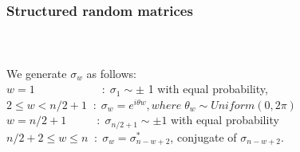\begin{frame}[t]
	\frametitle{Structured random matrices}
	\framesubtitle{~~}  %
	We generate $\sigma_{w}$ as follows:
    \\[1em]
    
    $w=1\qquad \qquad \qquad : \; \sigma_{1} \sim \pm$ 1 with equal probability,
    \\[1em]
    $2 \le w < n/2+1 \; \; : \; \sigma_{w}=e^{i\theta w}, where \; {\theta}_{w} \sim Uniform(0,2\pi) $
    \\[1em]
    $w=n/2+1 \qquad \; \; \, : \; \sigma_{n/2+1} \sim \pm 1 $ with equal probability 
    \\[1em]
    
    $n/2+2 \le w \le n \; \; : \; \sigma_{w}=\sigma^{*}_{n-w+2}$, conjugate of  $\sigma_{n-w+2}$.
    

\end{frame}

